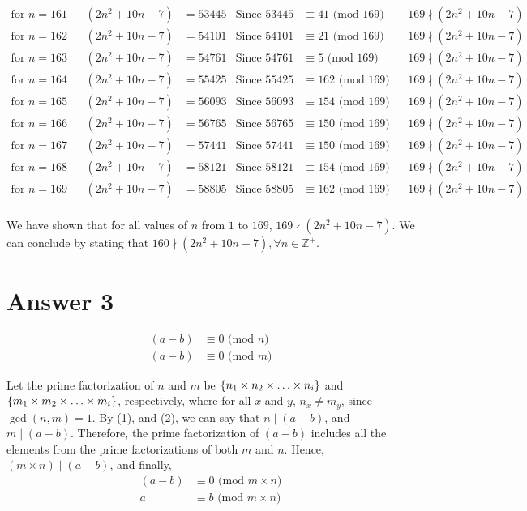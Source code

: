 \documentclass[12pt]{article}
\begin{document}
\begin{align*}
\text{for $n = 161 $}&& (2n^2+10n-7) &= 53445 & \text{Since } 53445  &\equiv  41 \text{ (mod $169$)}&& 169 \nmid (2n^2+10n-7)\\
\text{for $n = 162 $}&& (2n^2+10n-7) &= 54101 & \text{Since } 54101  &\equiv  21 \text{ (mod $169$)}&& 169 \nmid (2n^2+10n-7)\\
\text{for $n = 163 $}&& (2n^2+10n-7) &= 54761 & \text{Since } 54761  &\equiv  5 \text{ (mod $169$)}&& 169 \nmid (2n^2+10n-7)\\
\text{for $n = 164 $}&& (2n^2+10n-7) &= 55425 & \text{Since } 55425  &\equiv  162 \text{ (mod $169$)}&& 169 \nmid (2n^2+10n-7)\\
\text{for $n = 165 $}&& (2n^2+10n-7) &= 56093 & \text{Since } 56093  &\equiv  154 \text{ (mod $169$)}&& 169 \nmid (2n^2+10n-7)\\
\text{for $n = 166 $}&& (2n^2+10n-7) &= 56765 & \text{Since } 56765  &\equiv  150 \text{ (mod $169$)}&& 169 \nmid (2n^2+10n-7)\\
\text{for $n = 167 $}&& (2n^2+10n-7) &= 57441 & \text{Since } 57441  &\equiv  150 \text{ (mod $169$)}&& 169 \nmid (2n^2+10n-7)\\
\text{for $n = 168 $}&& (2n^2+10n-7) &= 58121 & \text{Since } 58121  &\equiv  154 \text{ (mod $169$)}&& 169 \nmid (2n^2+10n-7)\\
\text{for $n = 169 $}&& (2n^2+10n-7) &= 58805 & \text{Since } 58805  &\equiv  162 \text{ (mod $169$)}&& 169 \nmid (2n^2+10n-7)\\
\end{align*}

We have shown that for all values of $n$ from $1$ to $169$, $169 \nmid (2n^2 + 10n -7)$. We can conclude by stating that $160 \nmid (2n^2 + 10n -7), \forall n \in \mathbb{Z^+}$.

\newpage
\section*{Answer 3}

\begin{align}
	(a-b) &\equiv 0\text{ (mod $n$)}\\
	(a-b) &\equiv 0\text{ (mod $m$)}
\end{align}


Let the prime factorization of $n$ and $m$ be $\{n_1 \times n_2 \times \mathellipsis \times n_i\}$ and $\{m_1 \times m_2 \times \mathellipsis \times m_i\}$, respectively, where for all $x$ and $y$, $n_x \neq m_y$, since $\gcd(n,m) = 1$. By (1), and (2), we can say that $n \mid (a-b)$, and $m \mid (a-b)$. Therefore, the prime factorization of $(a-b)$ includes all the elements from the prime factorizations of both $m$ and $n$. Hence, $(m \times n) \mid (a-b)$, and finally,
\begin{align*}
	(a-b) &\equiv 0 \text{ (mod $m\times n$)}\\
	a &\equiv b \text{ (mod $m\times n$)}
\end{align*}
\end{document}
